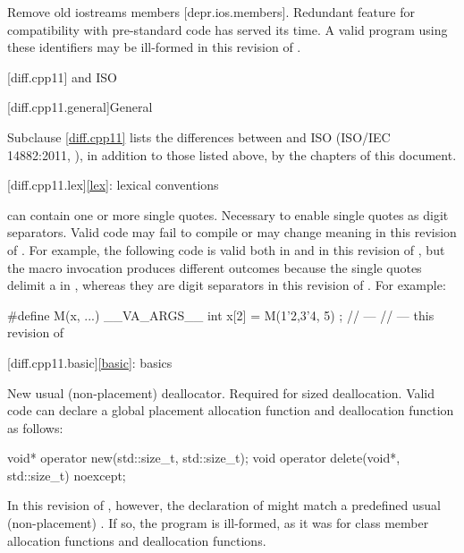 \nodiffref
\change
Remove old iostreams members [depr.ios.members].
\rationale
Redundant feature for compatibility with pre-standard code
has served its time.
\effect
A valid \CppXIV{} program using these identifiers
may be ill-formed in this revision of \Cpp{}.

[diff.cpp11]{\Cpp{} and ISO \CppXI{}}

[diff.cpp11.general]{General}

\pnum
{}%
Subclause \ref{diff.cpp11} lists the differences between \Cpp{} and
ISO \CppXI{} (ISO/IEC 14882:2011, ),
in addition to those listed above,
by the chapters of this document.

[diff.cpp11.lex]{\ref{lex}: lexical conventions}

\change
{} can contain one or more single quotes.
\rationale
Necessary to enable single quotes as digit separators.
\effect
Valid \CppXI{} code may fail to compile or may change meaning in this
revision of \Cpp{}. For example, the following code is valid both in \CppXI{} and in
this revision of \Cpp{}, but the macro invocation produces different outcomes
because the single quotes delimit a  in \CppXI{}, whereas they are digit
separators in this revision of \Cpp{}.
For example:
\begin{codeblock}
#define M(x, ...) __VA_ARGS__
int x[2] = { M(1'2,3'4, 5) };
//  --- \CppXI{}
//  --- this revision of \Cpp{}
\end{codeblock}

[diff.cpp11.basic]{\ref{basic}: basics}

\change
New usual (non-placement) deallocator.
\rationale
Required for sized deallocation.
\effect
Valid \CppXI{} code can declare a global placement allocation function and
deallocation function as follows:
\begin{codeblock}
void* operator new(std::size_t, std::size_t);
void operator delete(void*, std::size_t) noexcept;
\end{codeblock}
In this revision of \Cpp{}, however, the declaration of 
might match a predefined usual (non-placement)
. If so, the
program is ill-formed, as it was for class member allocation functions and
deallocation functions.


